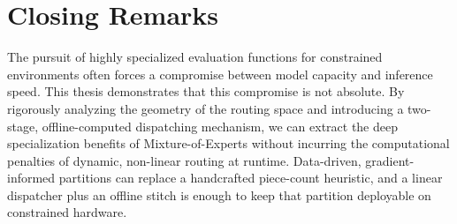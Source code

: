 \section{Closing Remarks}
The pursuit of highly specialized evaluation functions for constrained environments often forces a compromise between model capacity and inference speed. This thesis demonstrates that this compromise is not absolute. By rigorously analyzing the geometry of the routing space and introducing a two-stage, offline-computed dispatching mechanism, we can extract the deep specialization benefits of Mixture-of-Experts without incurring the computational penalties of dynamic, non-linear routing at runtime. Data-driven, gradient-informed partitions can replace a handcrafted piece-count heuristic, and a linear dispatcher plus an offline stitch is enough to keep that partition deployable on constrained hardware.